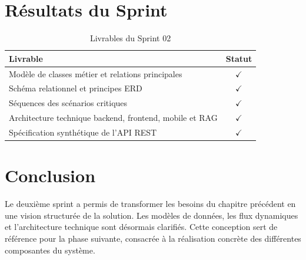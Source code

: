 \section{Résultats du Sprint}
\begin{table}[H]
\centering
\caption{Livrables du Sprint 02}
\label{tab:livrables_s2}
\begin{tabularx}{\textwidth}{|X|c|}
\hline
\textbf{Livrable} & \textbf{Statut} \\
\hline
Modèle de classes métier et relations principales & $\checkmark$ \\
\hline
Schéma relationnel et principes ERD & $\checkmark$ \\
\hline
Séquences des scénarios critiques & $\checkmark$ \\
\hline
Architecture technique backend, frontend, mobile et RAG & $\checkmark$ \\
\hline
Spécification synthétique de l'API REST & $\checkmark$ \\
\hline
\end{tabularx}
\end{table}

\section{Conclusion}
Le deuxième sprint a permis de transformer les besoins du chapitre précédent en une vision structurée de la solution. Les modèles de données, les flux dynamiques et l'architecture technique sont désormais clarifiés. Cette conception sert de référence pour la phase suivante, consacrée à la réalisation concrète des différentes composantes du système.
